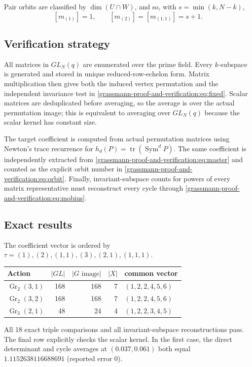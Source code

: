 \documentclass[10pt]{article}
\newcommand{\Sym}{\operatorname{Sym}}
\newcommand{\Gr}{\operatorname{Gr}}
\begin{document}
Pair orbits are classified by $\dim(U\cap W)$, and so, with
$s=\min(k,N-k)$,
\[
[m_{(1)}]=1,\qquad [m_{(2)}]=[m_{(1,1)}]=s+1.
\]

\subsection{Verification strategy}
All matrices in $GL_N(q)$ are enumerated over the prime field.  Every
$k$-subspace is generated and stored in unique reduced-row-echelon form.
Matrix multiplication then gives both the induced vertex permutation and the
independent invariance test in \eqref{grassmann-proof-and-verification:eq:fixed}.  Scalar matrices are deduplicated
before averaging, so the average is over the actual permutation image; this is
equivalent to averaging over $GL_N(q)$ because the scalar kernel has constant
size.

The target coefficient is computed from actual permutation matrices using
Newton's trace recurrence for $h_d(P)=\operatorname{tr}(\Sym^dP)$.  The same
coefficient is independently extracted from \eqref{grassmann-proof-and-verification:eq:master} and counted as
the explicit orbit number in \eqref{grassmann-proof-and-verification:eq:orbit}.  Finally, invariant-subspace
counts for powers of every matrix representative must reconstruct every cycle
through \eqref{grassmann-proof-and-verification:eq:mobius}.

\subsection{Exact results}
The coefficient vector is ordered by
$\tau=(1),(2),(1,1),(3),(2,1),(1,1,1)$.
\begin{center}
\begin{tabular}{@{}lrrrl@{}}
\toprule
Action & $|GL|$ & $|G\text{ image}|$ & $|X|$ & common vector\\
\midrule
$\Gr_2(3,1)$ & 168 & 168 & 7 & $(1,2,2,4,5,6)$\\
$\Gr_2(3,2)$ & 168 & 168 & 7 & $(1,2,2,4,5,6)$\\
$\Gr_3(2,1)$ & 48 & 24 & 4 & $(1,2,2,3,4,5)$\\
\bottomrule
\end{tabular}
\end{center}
All 18 exact triple comparisons and all invariant-subspace reconstructions
pass.  The final row explicitly checks the scalar kernel.  In the first case,
the direct determinant and cycle averages at $(0.037,0.061)$ both equal
$1.1152638116688691$ (reported error $0$).
\end{document}
